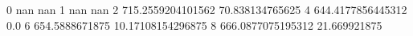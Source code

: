 0 nan nan
1 nan nan
2 715.2559204101562 70.838134765625
4 644.4177856445312 0.0
6 654.5888671875 10.17108154296875
8 666.0877075195312 21.669921875

